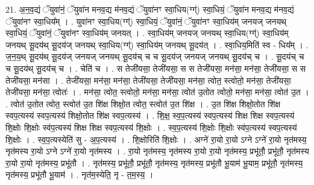 \documentclass[17pt]{extarticle}
\begin{document}
21. अ॒न॒व॒द्यं ॅयुवा॑नं॒ ॅयुवा॑न मनव॒द्य म॑नव॒द्यं ॅयुवा॑नꣳ स्वा॒धिय(ग्ग्॑) स्वा॒धियं॒ ॅयुवा॑न मनव॒द्य म॑नव॒द्यं ॅयुवा॑नꣳ स्वा॒धिय᳚म् । . युवा॑नꣳ स्वा॒धिय(ग्ग्॑) स्वा॒धियं॒ ॅयुवा॑नं॒ ॅयुवा॑नꣳ स्वा॒धिय॑म् जनयज् जनयथ् स्वा॒धियं॒ ॅयुवा॑नं॒ ॅयुवा॑नꣳ स्वा॒धिय॑म् जनयत् । . स्वा॒धिय॑म् जनयज् जनयथ् स्वा॒धिय(ग्ग्॑) स्वा॒धिय॑म् जनयथ् सू॒दय॑थ् सू॒दय॑ज् जनयथ् स्वा॒धिय(ग्ग्॑) स्वा॒धिय॑म् जनयथ् सू॒दय॑त् । . स्वा॒धिय॒मिति॑ स्व - धिय᳚म् । . ज॒न॒य॒थ् सू॒दय॑थ् सू॒दय॑ज् जनयज् जनयथ् सू॒दय॑च् च च सू॒दय॑ज् जनयज् जनयथ् सू॒दय॑च् च । . सू॒दय॑च् च च सू॒दय॑थ् सू॒दय॑च् च । . चेति॑ च । . स तेजी॑यसा॒ तेजी॑यसा॒ स स तेजी॑यसा॒ मन॑सा॒ मन॑सा॒ तेजी॑यसा॒ स स तेजी॑यसा॒ मन॑सा । . तेजी॑यसा॒ मन॑सा॒ मन॑सा॒ तेजी॑यसा॒ तेजी॑यसा॒ मन॑सा॒ त्वोत॒ स्त्वोतो॒ मन॑सा॒ तेजी॑यसा॒ तेजी॑यसा॒ मन॑सा॒ त्वोतः॑ । . मन॑सा॒ त्वोत॒ स्त्वोतो॒ मन॑सा॒ मन॑सा॒ त्वोत॑ उ॒तोत त्वोतो॒ मन॑सा॒ मन॑सा॒ त्वोत॑ उ॒त । . त्वोत॑ उ॒तोत त्वोत॒ स्त्वोत॑ उ॒त शि॑क्ष शिक्षो॒त त्वोत॒ स्त्वोत॑ उ॒त शि॑क्ष । . उ॒त शि॑क्ष शिक्षो॒तोत शि॑क्ष स्वप॒त्यस्य॑ स्वप॒त्यस्य॑ शिक्षो॒तोत शि॑क्ष स्वप॒त्यस्य॑ । . शि॒क्ष॒ स्व॒प॒त्यस्य॑ स्वप॒त्यस्य॑ शिक्ष शिक्ष स्वप॒त्यस्य॑ शि॒क्षोः शि॒क्षोः स्व॑प॒त्यस्य॑ शिक्ष शिक्ष स्वप॒त्यस्य॑ शि॒क्षोः । . स्व॒प॒त्यस्य॑ शि॒क्षोः शि॒क्षोः स्व॑प॒त्यस्य॑ स्वप॒त्यस्य॑ शि॒क्षोः । . स्व॒प॒त्यस्येति॑ सु - अ॒प॒त्यस्य॑ । . शि॒क्षोरिति॑ शि॒क्षोः । . अग्ने॑ रा॒यो रा॒यो ऽग्ने ऽग्ने॑ रा॒यो नृत॑मस्य॒ नृत॑मस्य रा॒यो ऽग्ने ऽग्ने॑ रा॒यो नृत॑मस्य । . रा॒यो नृत॑मस्य॒ नृत॑मस्य रा॒यो रा॒यो नृत॑मस्य॒ प्रभू॑तौ॒ प्रभू॑तौ॒ नृत॑मस्य रा॒यो रा॒यो नृत॑मस्य॒ प्रभू॑तौ । . नृत॑मस्य॒ प्रभू॑तौ॒ प्रभू॑तौ॒ नृत॑मस्य॒ नृत॑मस्य॒ प्रभू॑तौ भू॒याम॑ भू॒याम॒ प्रभू॑तौ॒ नृत॑मस्य॒ नृत॑मस्य॒ प्रभू॑तौ भू॒याम॑ । . नृत॑म॒स्येति॒ नृ - त॒म॒स्य॒ । \newline
\end{document}
